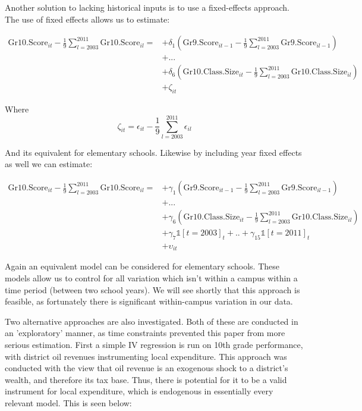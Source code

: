 \documentclass[11pt]{article}
\begin{document}
Another solution to lacking historical inputs is to use a fixed-effects approach. The use of fixed effects allows us to estimate:

\begin{align*}
\mathrm{Gr10.Score}_{it} - \frac{1}{9}\sum_{l=2003}^{2011} \mathrm{Gr10.Score}_{il}  = 
    &+\delta_{1}(\mathrm{Gr9.Score}_{it-1} - \frac{1}{9}\sum_{l=2003}^{2011} \mathrm{Gr9.Score}_{il-1})\\
    &+...\\
    &+\delta_{6}(\mathrm{Gr10.Class.Size}_{it} - \frac{1}{9}\sum_{l=2003}^{2011} \mathrm{Gr10.Class.Size}_{il})\\     &+\zeta_{it}
\end{align*}

Where $$   \zeta_{it} = \epsilon_{it} - \frac{1}{9}\sum_{l=2003}^{2011} \epsilon_{il}$$

And its equivalent for elementary schools. Likewise by including year fixed effects as well we can estimate:

\begin{align*}
\mathrm{Gr10.Score}_{it} - \frac{1}{9}\sum_{l=2003}^{2011} \mathrm{Gr10.Score}_{il}  = 
    &+\gamma_{1}(\mathrm{Gr9.Score}_{it-1} - \frac{1}{9}\sum_{l=2003}^{2011} \mathrm{Gr9.Score}_{il-1})\\
    &+...\\
    &+\gamma_{6}(\mathrm{Gr10.Class.Size}_{it} - \frac{1}{9}\sum_{l=2003}^{2011} \mathrm{Gr10.Class.Size}_{il})\\     
    &+\gamma_{7}\mathbb{1}[t=2003]_{t}+..+\gamma_{15}\mathbb{1}[t=2011]_{t}\\
    &+\upsilon_{it}
\end{align*}

Again an equivalent model can be considered for elementary schools. These models allow us to control for all variation which isn't within a campus within a time period (between two school years). We will see shortly that this approach is feasible, as fortunately there is significant within-campus variation in our data. 

Two alternative approaches are also investigated. Both of these are conducted in an 'exploratory' manner, as time constraints prevented this paper from more serious estimation. First a simple IV regression is run on 10th grade performance, with district oil revenues instrumenting local expenditure. This approach was conducted with the view that oil revenue is an exogenous shock to a district's wealth, and therefore its tax base. Thus, there is potential for it to be a valid instrument for local expenditure, which is endogenous in essentially every relevant model. This is seen below:
\end{document}
